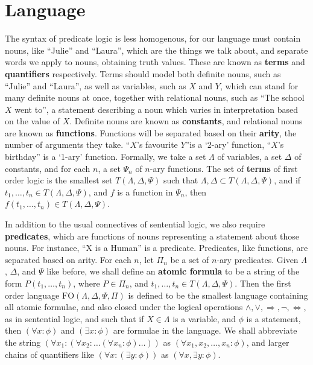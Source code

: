 \section{Language}

The syntax of predicate logic is less homogenous, for our language must contain nouns, like ``Julie'' and ``Laura'', which are the things we talk about, and separate words we apply to nouns, obtaining truth values. These are known as {\bf terms} and {\bf quantifiers} respectively. Terms should model both definite nouns, such as ``Julie'' and ``Laura'', as well as variables, such as $X$ and $Y$, which can stand for many definite nouns at once, together with relational nouns, such as ``The school $X$ went to'', a statement describing a noun which varies in interpretation based on the value of $X$. Definite nouns are known as {\bf constants}, and relational nouns are known as {\bf functions}. Functions will be separated based on their {\bf arity}, the number of arguments they take. ``$X$'s favourite $Y$''is a `2-ary' function, ``$X$'s birthday'' is a `1-ary' function. Formally, we take a set $\Lambda$ of variables, a set $\Delta$ of constants, and for each $n$, a set $\Psi_n$ of $n$-ary functions. The set of {\bf terms} of first order logic is the smallest set $T(\Lambda, \Delta, \Psi)$ such that $\Lambda, \Delta \subset T(\Lambda, \Delta, \Psi)$, and if $t_1, \dots, t_n \in T(\Lambda, \Delta, \Psi)$, and $f$ is a function in $\Psi_n$, then $f(t_1, \dots, t_n) \in T(\Lambda, \Delta, \Psi)$.

In addition to the usual connectives of sentential logic, we also require {\bf predicates}, which are functions of nouns representing a statement about those nouns. For instance, ``X is a Human'' is a predicate. Predicates, like functions, are separated based on arity. For each $n$, let $\Pi_n$ be a set of $n$-ary predicates. Given $\Lambda$, $\Delta$, and $\Psi$ like before, we shall define an {\bf atomic formula} to be a string of the form $P(t_1, \dots, t_n)$, where $P \in \Pi_n$, and $t_1, \dots, t_n \in T(\Lambda, \Delta, \Psi)$. Then the first order language $\text{FO}(\Lambda, \Delta, \Psi, \Pi)$ is defined to be the smallest language containing all atomic formulae, and also closed under the logical operations $\wedge, \vee, \Rightarrow, \neg, \Leftrightarrow$, as in sentential logic, and such that if $X \in \Lambda$ is a variable, and $\phi$ is a statement, then $(\forall x: \phi)$ and $(\exists x: \phi)$ are formulae in the language. We shall abbreviate the string $(\forall x_1 : (\forall x_2: \dots (\forall x_n: \phi)\dots))$ as $(\forall x_1, x_2, \dots, x_n : \phi)$, and larger chains of quantifiers like $(\forall x: (\exists y: \phi))$ as $(\forall x, \exists y: \phi)$.

